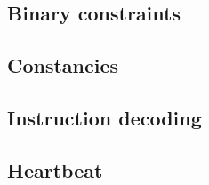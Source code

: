 \subsection{Binary constraints}              \label{rlp utils: generalities: binarities}               
\subsection{Constancies}                     \label{rlp utils: generalities: constancies}              
\subsection{Instruction decoding}            \label{rlp utils: generalities: instruction decoding}     
\subsection{Heartbeat}                       \label{rlp utils: generalities: heartbeat}                
